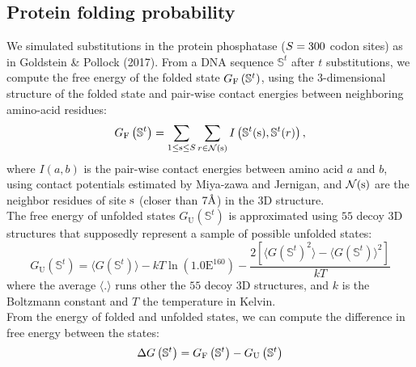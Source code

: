 \subsection{Protein folding probability}
\label{subsec:protein-folding-probability}

We simulated substitutions in the protein phosphatase ($S=300$ codon sites) as in Goldstein \& Pollock (2017).
From a \acrshort{DNA} sequence $\mathbb{S}^t$ after $t$ substitutions, we compute the free energy of the folded state $G_{\mathrm{F}}\left(\mathbb{S}^{t}\right)$, using the $3$-dimensional structure of the folded state and pair-wise contact energies between neighboring amino-acid residues:
\begin{equation}
    G_{\mathrm{F}}\left(\mathbb{S}^{t}\right) = \sum\limits_{1 \leq \text{s} \leq S} \sum\limits_{r \in \mathcal{N}(\text{s})} I \left(\mathbb{S}^t(\text{s}), \mathbb{S}^t(r) \right),
\end{equation}
where $I(a,b)$ is the pair-wise contact energies between amino acid $a$ and $b$, using contact potentials estimated by Miya-zawa and Jernigan, and $\mathcal{N}(\text{s})$ are the neighbor residues of site $\text{s}$ (closer than $7\text{\normalfont\AA}$) in the $3$D structure.\\

The free energy of unfolded states $G_{\mathrm{U}}\left(\mathbb{S}^{t}\right)$ is approximated using $55$ decoy $3$D structures that supposedly represent a sample of possible unfolded states:
\begin{equation}
    G_{\mathrm{U}}\left(\mathbb{S}^{t}\right) = \langle G\left(\mathbb{S}^{t}\right) \rangle - kT \ln (1.0\mathrm{E}^{160}) - \dfrac{2 \left[ \langle G\left(\mathbb{S}^{t}\right)^2 \rangle - \langle G\left(\mathbb{S}^{t}\right) \rangle^2\right] }{kT}
\end{equation}
where the average $\langle . \rangle$ runs other the $55$ decoy $3$D structures, and $k$ is the Boltzmann constant and $T$ the temperature in Kelvin.\\

From the energy of folded and unfolded states, we can compute the difference in free energy between the states:
\begin{equation}
    \Delta G\left(\mathbb{S}^{t}\right) = G_{\mathrm{F}}\left(\mathbb{S}^{t}\right) - G_{\mathrm{U}}\left(\mathbb{S}^{t}\right)
\end{equation}

